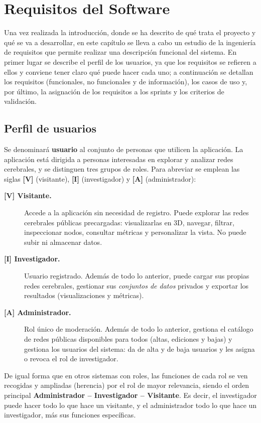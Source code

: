 \chapter{Requisitos del Software}

Una vez realizada la introducción, donde se ha descrito de qué trata el proyecto y qué se va a
desarrollar, en este capítulo se lleva a cabo un estudio de la ingeniería de requisitos que permite
realizar una descripción funcional del sistema. En primer lugar se describe el perfil de los
usuarios, ya que los requisitos se refieren a ellos y conviene tener claro qué puede hacer cada uno;
a continuación se detallan los requisitos (funcionales, no funcionales y de información), los casos
de uso y, por último, la asignación de los requisitos a los sprints y los criterios de validación.

\section{Perfil de usuarios}

Se denominará \textbf{usuario} al conjunto de personas que utilicen la aplicación. La aplicación está
dirigida a personas interesadas en explorar y analizar redes cerebrales, y se distinguen tres grupos
de roles. Para abreviar se emplean las siglas \textbf{[V]} (visitante),
\textbf{[I]} (investigador) y \textbf{[A]} (administrador):

\begin{description}
	\item[\textbf{[V] Visitante.}] Accede a la aplicación sin necesidad de registro. Puede explorar
		las redes cerebrales públicas precargadas: visualizarlas en 3D, navegar, filtrar, inspeccionar
		nodos, consultar métricas y personalizar la vista. No puede subir ni almacenar datos.
	\item[\textbf{[I] Investigador.}] Usuario registrado. Además de todo lo anterior, puede cargar sus
		propias redes cerebrales, gestionar sus \textit{conjuntos de datos} privados y exportar los
		resultados (visualizaciones y métricas).
	\item[\textbf{[A] Administrador.}] Rol único de moderación. Además de todo lo anterior, gestiona el
		catálogo de redes públicas disponibles para todos (altas, ediciones y bajas) y gestiona los
		usuarios del sistema: da de alta y de baja usuarios y les asigna o revoca el rol de
		investigador.
\end{description}

De igual forma que en otros sistemas con roles, las funciones de cada rol se ven recogidas y
ampliadas (herencia) por el rol de mayor relevancia, siendo el orden principal \textbf{Administrador
-- Investigador -- Visitante}. Es decir, el investigador puede hacer todo lo que hace un visitante, y
el administrador todo lo que hace un investigador, más sus funciones específicas.

